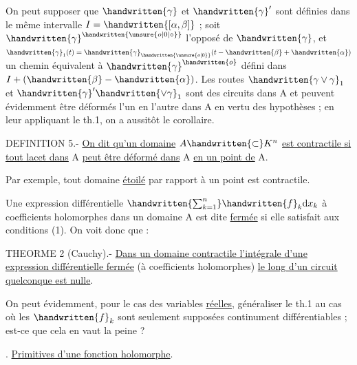 On peut supposer que $\handwritten{\gamma}$ et $\handwritten{\gamma}'$ sont définies dans le même intervalle $I=\handwritten{[\alpha,\beta]}$ ; soit $\handwritten{\gamma}^{\handwritten{\unsure{o|0|\circ}}}$ l'opposé de $\handwritten{\gamma}$, et $\handwritten{\gamma}_1(t)=\handwritten{\gamma}_{\handwritten{\unsure{o|0}}}(t-\handwritten{\beta}+\handwritten{\alpha})$ un chemin équivalent à $\handwritten{\gamma}^{\handwritten{o}}$ défini dans $I+(\handwritten{\beta}-\handwritten{\alpha})$. Les routes $\handwritten{\gamma\vee\gamma}_1$ et $\handwritten{\gamma}'\handwritten{\vee\gamma}_1$ sont des circuits dans A et peuvent évidemment être déformés l'un en l'autre dans A en vertu des hypothèses ; en leur appliquant le th.1, on a aussitôt le corollaire.

D\handwritten{\rlap{\'{\phantom{E}}}}EFINITION 5.- \uline{On dit qu'un domaine} $A\handwritten{\subset}K^n$ \uline{est contractile si tout lacet dans} A \uline{peut être déformé dans} A \uline{en un point de} A.

Par exemple, tout domaine \uline{étoilé} par rapport à un point est contractile.

Une expression différentielle $\handwritten{\sum_{k=1}^n}\handwritten{f}_k\mathrm{d}x_k$ à coefficients holomorphes dans un domaine A est dite \uline{fermée} si elle satisfait aux conditions (1). On voit donc que :

TH\handwritten{\rlap{\'{\phantom{E}}}}EORME 2 (Cauchy).- \uline{Dans un domaine contractile l'intégrale d'une expression différentielle fermée} (à coefficients holomorphes) \uline{le long d'un circuit quelconque est nulle}.

On peut évidemment, pour le cas des variables \uline{réelles}, généraliser le th.1 au cas où les $\handwritten{f}_k$ sont seulement supposées continument différentiables ; est-ce que cela en vaut la peine ?

. \uline{Primitives d'une fonction holomorphe}.

